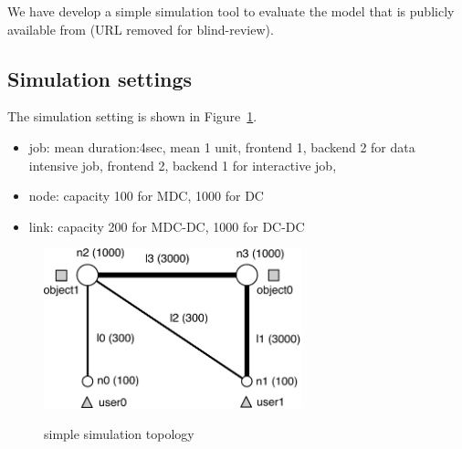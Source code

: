 
We have develop a simple simulation tool to evaluate the model
that is publicly available from (URL removed for blind-review).

\subsection{Simulation settings}

The simulation setting is shown in Figure~\ref{fig:topology-simple}.
\begin{itemize}
  \item		job: mean duration:4sec, mean 1 unit,
        frontend 1, backend 2 for data intensive job,
        frontend 2, backend 1 for interactive job,
  \item		node: capacity 100 for MDC, 1000 for DC
  \item		link: capacity 200 for MDC-DC, 1000 for DC-DC
\end{itemize}

\begin{figure}[tb]
  \begin{center}
    \includegraphics[width=7.5cm,clip]{topology-simple.pdf}
    \vspace{-2.0ex}
    \caption{simple simulation topology}
    \label{fig:topology-simple}
  \end{center}
\end{figure}

